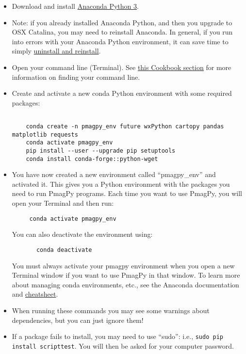 \documentclass[11pt]{article}
\begin{document}
\begin{itemize}
\item Download and install \href{https://www.anaconda.com/download}{Anaconda Python 3}.
  \item Note: if you already installed Anaconda Python, and then you upgrade to OSX Catalina, you may need to reinstall Anaconda.  In general, if you run into errors with your Anaconda Python environment, it can save time to simply \href{https://docs.anaconda.com/anaconda/install/uninstall/}{uninstall and reinstall}.
   \item Open your command line (Terminal).  See \href{https://earthref.org/PmagPy/cookbook/#command_line}{this Cookbook section} for more information on finding your command line.
   \item Create and activate a new conda Python environment with some required packages: \begin{verbatim}

    conda create -n pmagpy_env future wxPython cartopy pandas matplotlib requests
    conda activate pmagpy_env
    pip install --user --upgrade pip setuptools
    conda install conda-forge::python-wget
\end{verbatim}
   \item You have now created a new environment called ``pmagpy\_env'' and activated it.  This gives you a Python environment with the packages you need to run PmagPy programs.  Each time you want to use PmagPy, you will open your Terminal and then run:

     \begin{verbatim}
     conda activate pmagpy_env
\end{verbatim}
     You can also deactivate the environment using:

     \begin{verbatim}
       conda deactivate
       \end{verbatim}

     You must always activate your pmagpy environment when you open a new Terminal window if you want to use PmagPy in that window.  To learn more about managing conda environments, etc., see the Anaconda documentation and \href{https://know.continuum.io/rs/387-XNW-688/images/conda-cheatsheet.pdf}{cheatsheet}.
   \item When running these commands you may see some warnings about dependencies, but you can just ignore them!

\item If a package fails to install, you may need to use ``sudo'': i.e., \texttt{sudo pip install scripttest}.  You will then be asked for your computer password.

  \end{itemize}
\end{document}
